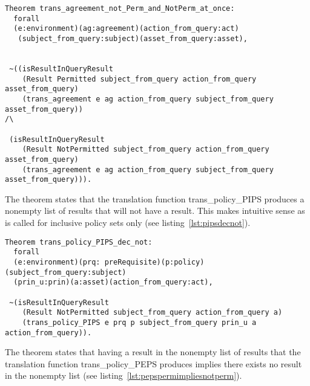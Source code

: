 \begin{lstlisting}
Theorem trans_agreement_not_Perm_and_NotPerm_at_once:
  forall
  (e:environment)(ag:agreement)(action_from_query:act)
   (subject_from_query:subject)(asset_from_query:asset),


 ~((isResultInQueryResult 
    (Result Permitted subject_from_query action_from_query asset_from_query)
    (trans_agreement e ag action_from_query subject_from_query asset_from_query)) 
/\

 (isResultInQueryResult 
    (Result NotPermitted subject_from_query action_from_query asset_from_query)
    (trans_agreement e ag action_from_query subject_from_query asset_from_query))).

\end{lstlisting}

The theorem  states that the translation function trans_policy_PIPS produces a nonempty list of results that will not have a  result. This makes intuitive sense as  is called for inclusive policy sets only (see listing~\ref{lst:pipsdecnot}).
\begin{lstlisting}
Theorem trans_policy_PIPS_dec_not:
  forall
  (e:environment)(prq: preRequisite)(p:policy)(subject_from_query:subject)
  (prin_u:prin)(a:asset)(action_from_query:act),

 ~(isResultInQueryResult 
    (Result NotPermitted subject_from_query action_from_query a)
    (trans_policy_PIPS e prq p subject_from_query prin_u a action_from_query)).

\end{lstlisting}

The theorem  states that having a  result in the nonempty list of results that the translation function trans_policy_PEPS produces implies there exists no  result in the nonempty list (see listing~\ref{lst:pepspermimpliesnotperm}).

